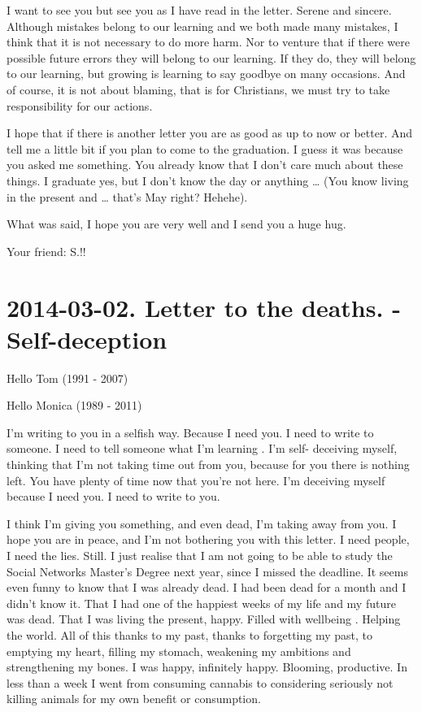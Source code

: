 \documentclass[]{book}
\begin{document}
I want to see you but see you as I have read in the letter. Serene and sincere. Although mistakes belong to our learning and we both made many mistakes, I think that it is not necessary to do more harm. Nor to venture that if there were possible future errors they will belong to our learning. If they do, they will belong to our learning, but growing is learning to say goodbye on many occasions. And of course, it is not about blaming, that is for Christians, we must try to take responsibility for our actions.

I hope that if there is another letter you are as good as up to now or better. And tell me a little bit if you plan to come to the graduation. I guess it was because you asked me something. You already know that I don't care much about these things. I graduate yes, but I don't know the day or anything \ldots{} (You know living in the present and \ldots{} that's May right? Hehehe).

What was said, I hope you are very well and I send you a huge hug.

Your friend: S.!!

\hypertarget{todeath2014-03-02}{%
\section*{2014-03-02. Letter to the deaths. - Self-deception}\label{todeath2014-03-02}}

Hello Tom (1991 - 2007)

Hello Monica (1989 - 2011)

I'm writing to you in a selfish way. Because I need you. I need to write to someone. I need to tell someone what I'm learning . I'm self- deceiving myself, thinking that I'm not taking time out from you, because for you there is nothing left. You have plenty of time now that you're not here. I'm deceiving myself because I need you. I need to write to you.

I think I'm giving you something, and even dead, I'm taking away from you. I hope you are in peace, and I'm not bothering you with this letter. I need people, I need the lies. Still. I just realise that I am not going to be able to study the Social Networks Master's Degree next year, since I missed the deadline. It seems even funny to know that I was already dead. I had been dead for a month and I didn't know it. That I had one of the happiest weeks of my life and my future was dead. That I was living the present, happy. Filled with wellbeing . Helping the world. All of this thanks to my past, thanks to forgetting my past, to emptying my heart, filling my stomach, weakening my ambitions and strengthening my bones. I was happy, infinitely happy. Blooming, productive. In less than a week I went from consuming cannabis to considering seriously not killing animals for my own benefit or consumption.
\end{document}
